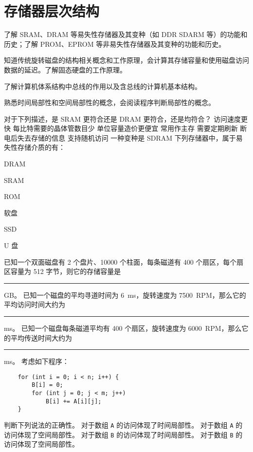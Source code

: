 \chapter{存储器层次结构}
    \begin{summary}
        \begin{compactitem}
            \item 了解 SRAM、DRAM 等易失性存储器及其变种（如 DDR SDARM 等）的功能和历史；了解 PROM、EPROM 等非易失性存储器及其变种的功能和历史。
            \item 知道传统旋转磁盘的结构相关概念和工作原理，会计算其存储容量和使用磁盘访问数据的延迟。了解固态硬盘的工作原理。
            \item 了解计算机体系结构中总线的作用以及含总线的计算机基本结构。
            \item 熟悉时间局部性和空间局部性的概念，会阅读程序判断局部性的概念。
        \end{compactitem}
    \end{summary}

    \begin{problems}
        \pro 对于下列描述，是 SRAM 更符合还是 DRAM 更符合，还是均符合？
            \qn 访问速度更快
            \qn 每比特需要的晶体管数目少
            \qn 单位容量造价更便宜
            \qn 常用作主存
            \qn 需要定期刷新
            \qn 断电后失去存储的信息
            \qn 支持随机访问
            \qn 一种变种是 SDRAM
        \pro 下列存储器中，属于易失性存储介质的有：
            \begin{choices}
                \item DRAM
                \item SRAM
                \item ROM
                \item 软盘
                \item SSD
                \item U 盘
            \end{choices}
        \pro 已知一个双面磁盘有 2 个盘片、10000 个柱面，每条磁道有 400 个扇区，每个扇区容量为 512 字节，则它的存储容量是 \rule{2.5cm}{0.25mm} GB。
        \pro 已知一个磁盘的平均寻道时间为 \SI{6}{ms}，旋转速度为 \SI{7500}{RPM}，那么它的平均访问时间大约为 \rule{2.5cm}{0.25mm} ms。
        \pro 已知一个磁盘每条磁道平均有 400 个扇区，旋转速度为 \SI{6000}{RPM}，那么它的平均传送时间大约为 \rule{2.5cm}{0.25mm} ms。
        \pro 考虑如下程序：
        \begin{verbatim}
    for (int i = 0; i < n; i++) {
        B[i] = 0;
        for (int j = 0; j < m; j++)
            B[i] += A[i][j];
    }
        \end{verbatim}
        判断下列说法的正确性。
            \qn 对于数组 \verb|A| 的访问体现了时间局部性。
            \qn 对于数组 \verb|A| 的访问体现了空间局部性。
            \qn 对于数组 \verb|B| 的访问体现了时间局部性。
            \qn 对于数组 \verb|B| 的访问体现了空间局部性。
    \end{problems}

